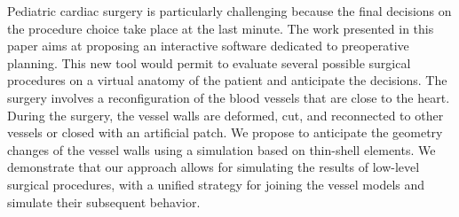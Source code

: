 Pediatric cardiac surgery is particularly challenging because the final decisions on the procedure choice take place at the last minute.
The work presented in this paper aims at proposing an interactive software dedicated to preoperative planning.
This new tool would permit to evaluate several possible surgical procedures on a virtual anatomy of the patient and anticipate the decisions.
The surgery involves a reconfiguration of the blood vessels that are close to the heart.
During the surgery, the vessel walls are deformed, cut, and reconnected to other vessels or closed with an artificial patch.
We propose to anticipate the geometry changes of the vessel walls using a simulation based on thin-shell elements.
We demonstrate that our approach allows for simulating the results of low-level surgical procedures, with a unified strategy for joining the vessel models and simulate their subsequent behavior.
